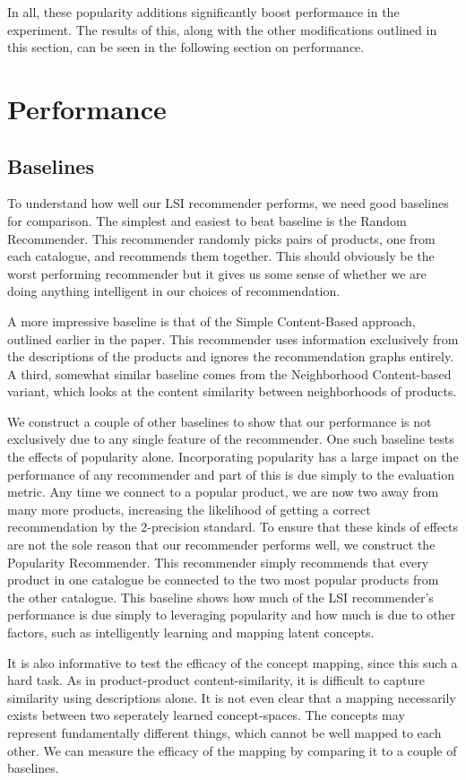 \documentclass[11pt]{article}
\begin{document}
In all, these popularity additions significantly boost performance in the
experiment. The results of this, along with the other modifications outlined in
this section, can be seen in the following section on performance.

\section*{Performance}
\subsection*{Baselines}
To understand how well our LSI recommender performs, we need good baselines
for comparison.  The simplest and easiest to beat baseline is the Random 
Recommender. This recommender randomly picks pairs of products, one from 
each catalogue, and recommends them together. This should obviously be the 
worst performing recommender but it gives us some sense of whether we are 
doing anything intelligent in our choices of recommendation.

A more impressive baseline is that of the Simple Content-Based approach, 
outlined earlier in the paper. This recommender uses information exclusively
from the descriptions of the products and ignores the recommendation graphs 
entirely. A third, somewhat similar baseline comes from the Neighborhood 
Content-based variant, which looks at the content similarity between 
neighborhoods of products.

We construct a couple of other baselines to show that our performance is not
exclusively due to any single feature of the recommender. One such baseline
tests the effects of popularity alone. Incorporating popularity has a large 
impact on the performance of any recommender and part of this is due simply 
to the evaluation metric. Any time we connect to a popular product, we are 
now two away from many more products, increasing the likelihood of getting a
correct recommendation by the 2-precision standard. To ensure that these kinds 
of effects are not the sole reason that our recommender performs well, 
we construct the Popularity Recommender. This recommender simply recommends 
that every product in one catalogue be connected to the two most popular 
products from the other catalogue. This baseline shows how much of the LSI 
recommender's performance is due simply to leveraging popularity and how 
much is due to other factors, such as intelligently learning and mapping 
latent concepts.

It is also informative to test the efficacy of the concept mapping, since this
such a hard task. As in product-product content-similarity, it is difficult to
capture similarity using descriptions alone. It is not even clear that a mapping 
necessarily exists between two seperately learned concept-spaces. The concepts 
may represent fundamentally different things, which cannot be well mapped to 
each other. We can measure the efficacy of the mapping by comparing it to a 
couple of baselines. 
\end{document}
